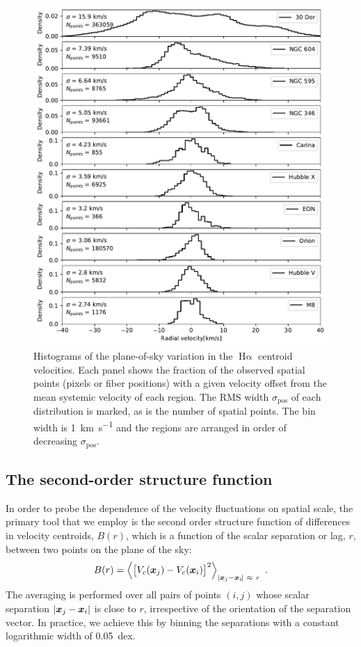 \documentclass[fleqn,usenatbib, useAMS, a4paper]{mnras}
\newcommand\pos{\ensuremath{_{\mathrm{pos}}}}
\newcommand\ha{\ensuremath{\text{H}\upalpha}}
\begin{document}
\begin{figure}
 \centering
 \includegraphics[width=5in]{Figures/pdfs}\par
 \caption{
   Histograms of the plane-of-sky variation in the \ha{} centroid velocities.
   Each panel shows the fraction of the observed spatial points
   (pixels or fiber positions)
   with a given velocity offset from the mean systemic velocity of each region.
   The RMS width \(\sigma\pos\) of each distribution is marked,
   as is the number of spatial points.
   The bin width is \SI{1}{km.s^{-1}} and the regions are arranged
   in order of decreasing \(\sigma\pos\).
 }
 \label{fig:pdfs}
\end{figure}


\subsection{The second-order structure function}
\label{sec:second-order-struct}


In order to probe the dependence of the velocity fluctuations
on spatial scale,
the primary tool that we employ is
the second order structure function of differences in velocity centroids,
$B(r)$, which is a function of the scalar separation or lag, \(r\),
between two points on the plane of the sky:
%
\newcommand\Abs[1]{\vert #1\vert}
\begin{equation}\label{eq:Br}
  B(r) = \left\langle 
  \bigl[
  V_{c}(\xx_j) - V_{c}(\xx_i)
  \bigr]^{2} \right \rangle_{\Abs{\xx_j - \xx_i\!} \ \approx \ r} \ .
\end{equation}
The averaging is performed over all pairs of points
\((i, j)\)
whose scalar separation \(\Abs{\xx_j - \xx_i}\) is close to \(r\),
irrespective of the orientation of the separation vector.
In practice, we achieve this by binning the separations with a constant
logarithmic width of \SI{0.05}{dex}.
\end{document}
